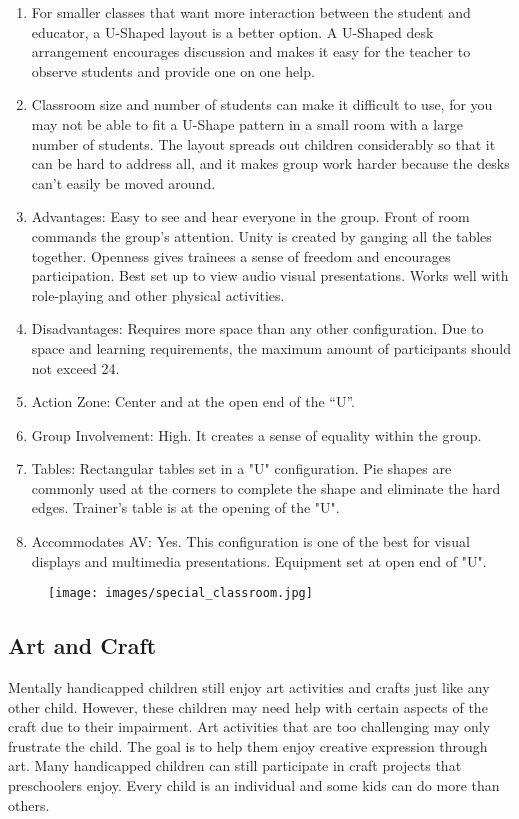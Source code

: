 \begin{enumerate}
    \item For smaller classes that want more interaction between the student and educator, a U-Shaped layout is a better option. A U-Shaped desk arrangement encourages discussion and makes it easy for the teacher to observe students and provide one on one help.
    \item Classroom size and number of students can make it difficult to use, for you may not be able to fit a U-Shape pattern in a small room with a large number of students. The layout spreads out children considerably so that it can be hard to address all, and it makes group work harder because the desks can’t easily be moved around.
    \item Advantages: Easy to see and hear everyone in the group. Front of room commands the group’s attention. Unity is created by ganging all the tables together. Openness gives trainees a sense of freedom and encourages participation. Best set up to view audio visual presentations. Works well with role-playing and other physical activities.
    \item Disadvantages: Requires more space than any other configuration. Due to space and learning requirements, the maximum amount of participants should not exceed 24.
    \item Action Zone: Center and at the open end of the ``U''.
    \item Group Involvement: High. It creates a sense of equality within the group.
    \item Tables: Rectangular tables set in a "U" configuration. Pie shapes are commonly used at the corners to complete the shape and eliminate the hard edges. Trainer’s table is at the opening of the "U".
    \item Accommodates AV: Yes. This configuration is one of the best for visual displays and multimedia presentations. Equipment set at open end of "U".
\end{enumerate}
\begin{figure}[H]
    \centering
    \texttt{[image: images/special\_classroom.jpg]}
\end{figure}
\subsection{Art and Craft}
Mentally handicapped children still enjoy art activities and crafts just like any other child. However, these children may need help with certain aspects of the craft due to their impairment. Art activities that are too challenging may only frustrate the child. The goal is to help them enjoy creative expression through art. Many handicapped children can still participate in craft projects that preschoolers enjoy. Every child is an individual and some kids can do more than others.\\

